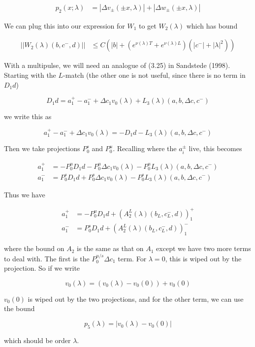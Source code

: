 \documentclass[12pt]{article}
\begin{document}
\begin{enumerate}
\begin{align*}
p_2(x; \lambda) &= |\Delta v_\pm(\pm x, \lambda)| + |\Delta w_\pm(\pm x, \lambda)| 
\end{align*}

We can plug this into our expression for $W_1$ to get $W_2(\lambda)$ which has bound

\begin{align*}
||W_2(\lambda)(b,c^-, d)|| &\leq C (|b| + (e^{\nu(\lambda)T} + e^{\nu(\lambda)L})(|c^-| + |\lambda|^2))
\end{align*}

With a multipulse, we will need an analogue of (3.25) in Sandstede (1998). Starting with the $L$-match (the other one is not useful, since there is no term in $D_1 d$)

\[
D_1 d = a_1^+ - a_1^- + \Delta c_1 v_0(\lambda) + L_3(\lambda)(a, b, \Delta c, c^-)
\]

we write this as

\[
a_1^+ - a_1^- + \Delta c_1 v_0(\lambda) = -D_1 d - L_3(\lambda)(a, b, \Delta c, c^-)
\]

Then we take projections $P^s_0$ and $P^u_0$. Recalling where the $a_i^\pm$ live, this becomes 

\begin{align*}
a_1^+ &= -P^u_0 D_1 d - P^u_0 \Delta c_1 v_0(\lambda) - P^u_0 L_3(\lambda)(a, b, \Delta c, c^-) \\
a_1^- &=  P^s_0 D_1 d + P^s_0 \Delta c_1 v_0(\lambda) - P^s_0 L_3(\lambda)(a, b, \Delta c, c^-)
\end{align*}

Thus we have

\begin{align*}
a_1^+ &= -P^u_0 D_1 d + (A_2^L(\lambda)(b_L, c_L^-, d))_1^+\\
a_1^- &=  P^s_0 D_1 d + (A_2^L(\lambda)(b_L, c_L^-, d))_1^-
\end{align*}

where the bound on $A_2$ is the same as that on $A_1$ except we have two more terms to deal with. The first is the $P^{u/s}_0 \Delta c_1$ term. For $\lambda = 0$, this is wiped out by the projection. So if we write

\[
v_0(\lambda) = (v_0(\lambda) - v_0(0)) + v_0(0)
\]

$v_0(0)$ is wiped out by the two projections, and for the other term, we can use the bound

\[
p_5(\lambda) = |v_0(\lambda) - v_0(0)| 
\]

which should be order $\lambda$.


\end{enumerate}
\end{document}
